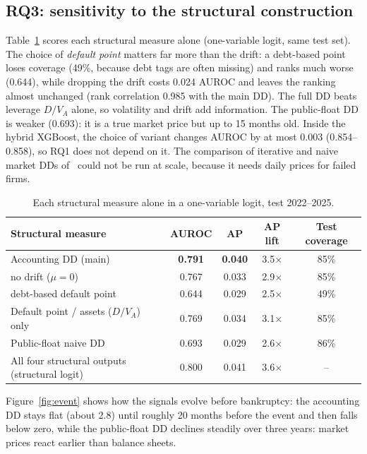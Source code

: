 \subsection{RQ3: sensitivity to the structural construction}

Table~\ref{tab:rq3} scores each structural measure alone (one-variable logit, same test set). The choice of
\emph{default point} matters far more than the drift: a debt-based point loses coverage (49\%, because debt
tags are often missing) and ranks much worse (0.644), while dropping the drift costs 0.024 AUROC and
leaves the ranking almost unchanged (rank correlation 0.985 with the main DD). The full DD beats leverage
$D/V_A$ alone, so volatility and drift add information. The public-float DD is weaker (0.693): it is a true
market price but up to 15 months old. Inside the hybrid XGBoost, the choice of variant changes AUROC by at most
0.003 (0.854--0.858), so RQ1 does not depend on it. The comparison of iterative and naive market DDs
of~\cite{bharath2008} could not be run at scale, because it needs daily prices for failed firms.

\begin{table}[htbp]
\centering
\small
\begin{tabular}{lcccc}
\toprule
Structural measure & AUROC & AP & AP lift & Test coverage \\
\midrule
Accounting DD (main) & \textbf{0.791} & \textbf{0.040} & 3.5$\times$ & 85\% \\
\quad no drift ($\mu=0$) & 0.767 & 0.033 & 2.9$\times$ & 85\% \\
\quad debt-based default point & 0.644 & 0.029 & 2.5$\times$ & 49\% \\
Default point / assets ($D/V_A$) only & 0.769 & 0.034 & 3.1$\times$ & 85\% \\
Public-float naive DD & 0.693 & 0.029 & 2.6$\times$ & 86\% \\
\midrule
All four structural outputs (structural logit) & 0.800 & 0.041 & 3.6$\times$ & -- \\
\bottomrule
\end{tabular}
\caption{Each structural measure alone in a one-variable logit, test 2022--2025.}
\label{tab:rq3}
\end{table}

Figure~\ref{fig:event} shows how the signals evolve before bankruptcy: the accounting DD stays flat (about
2.8) until roughly 20 months before the event and then falls below zero, while the public-float DD declines
steadily over three years: market prices react earlier than balance sheets.

